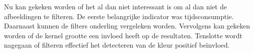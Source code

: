 Nu kan gekeken worden of het al dan niet interessant is om al dan niet de afbeeldingen te filteren. 
De eerste belangrijke indicator was tijdsconsumptie. Daarnaast kunnen de filters onderling vergeleken worden. Vervolgens kan gekeken worden of de kernel grootte een invloed heeft op de resultaten. Tenslotte wordt nagegaan  of filteren effectief het detecteren van de kleur positief beïnvloed. 